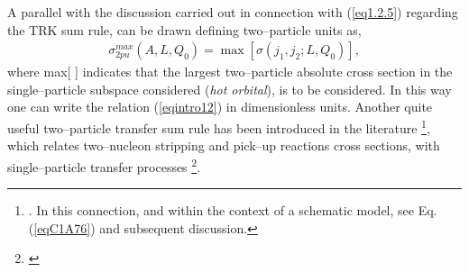 A parallel with the discussion carried out in connection with (\ref{eq1.2.5}) regarding the TRK sum rule, can be drawn defining two--particle units as,
\begin{align}
\sigma^{max}_{2pu}(A,L,Q_0)=\max \left[\sigma(j_1,j_2;L,Q_0)\right],
\end{align}
where max[ ] indicates that the largest two--particle absolute cross section in the single--particle subspace considered (\textit{hot orbital}), is to be considered. In this way one can write the relation (\ref{eqintro12}) in dimensionless units.  Another quite useful two--particle transfer sum rule has been introduced in the literature \footnote{\cite{Bayman:72}. In this connection, and within the context of a schematic model, see Eq. (\ref{eqC1A76}) and subsequent discussion.}, which relates two--nucleon stripping and pick--up reactions cross sections, with single--particle transfer processes \footnote{\cite{Lanford:77}}.


